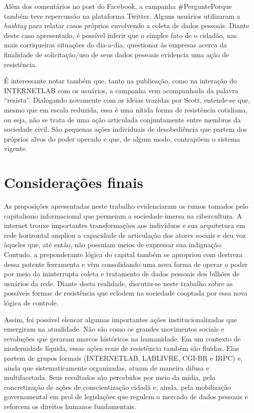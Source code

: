 Além dos comentários no post do Facebook, a campanha \#PerguntePorque
também teve repercussão na plataforma Twitter. Alguns usuários
utilizaram a \emph{hashtag} para relatar casos próprios envolvendo a
coleta de dados pessoais. Diante deste caso apresentado, é possível
inferir que o simples fato de o cidadão, nas mais corriqueiras situações
do dia-a-dia, questionar às empresas acerca da finalidade de
solicitação/uso de seus dados pessoais evidencia uma ação de
resistência.

É interessante notar também que, tanto na publicação, como na interação
do INTERNETLAB com os usuários, a campanha vem acompanhada da palavra
``resista''. Dialogando novamente com as ideias trazidas por Scott,
entende-se que, mesmo que em escala reduzida, essa é uma nítida forma de
resistência cotidiana, ou seja, não se trata de uma ação articulada
conjuntamente entre membros da sociedade civil. São pequenas ações
individuais de desobediência que partem dos próprios alvos do poder
operado e que, de algum modo, contrapõem o sistema vigente.

\section{Considerações finais}

As proposições apresentadas neste trabalho evidenciaram os rumos tomados
pelo capitalismo informacional que permeiam a sociedade imersa na
cibercultura. A internet trouxe importantes transformações aos
indivíduos e sua arquitetura em rede horizontal ampliou a capacidade de
articulação dos atores sociais e deu voz àqueles que, até então, não
possuíam meios de expressar sua indignação. Contudo, a preponderante
lógica do capital também se apropriou com destreza dessa potente
ferramenta e vêm consolidando uma nova forma de operar o poder por meio
da ininterrupta coleta e tratamento de dados pessoais dos bilhões de
usuários da rede. Diante desta realidade, discutiu-se neste trabalho
sobre as possíveis formas de resistência que eclodem na sociedade
cooptada por essa nova lógica de controle.

Assim, foi possível elencar algumas importantes ações
institucionalizadas que emergiram na atualidade. Não são como os grandes
movimentos sociais e revoluções que geraram marcos históricos na
humanidade. Em um contexto de modernidade líquida, essas ações reais de
resistência também são fluidas. Elas partem de grupos formais
(INTERNETLAB, LABLIVRE, CGI-BR e IRPC) e, ainda que sistematicamente
organizadas, atuam de maneira difusa e multifacetada. Seus resultados
são percebidos por meio da mídia, pela concretização de ações de
conscientização cidadã e, ainda, pela mobilização governamental em prol
de legislações que regulem o mercado de dados pessoais e reforcem os
direitos humanos fundamentais.

